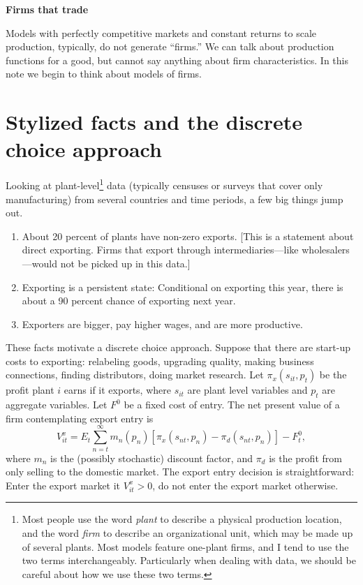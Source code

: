 \documentclass[11pt, pdftex]{article}
\newcommand{\ph}{\phantom}
\begin{document}
\ph{whatever}
\medskip

\centerline{\bf \Large Firms that trade}
\medskip

Models with perfectly competitive markets and constant returns to scale production, typically, do not generate ``firms.'' We can talk about production functions for a good, but cannot say anything about firm characteristics. In this note we begin to think about models of firms. 

\section{Stylized facts and the discrete choice approach}
Looking at plant-level\footnote{Most people use the word \textit{plant} to describe a physical production location, and the word \textit{firm} to describe an organizational unit, which may be made up of several plants.  Most models feature one-plant firms, and I tend to use the two terms interchangeably.  Particularly when dealing with data, we should be careful about how we use these two terms. } data (typically censuses or surveys that cover only manufacturing) from several countries and time periods, a few big things jump out.
\begin{enumerate}
  \item About 20 percent of plants have non-zero exports. [This is a statement about direct exporting. Firms that export through intermediaries---like wholesalers---would not be picked up in this data.]
  \item Exporting is a persistent state: Conditional on exporting this year, there is about a 90 percent chance of exporting next year.
  \item Exporters are bigger, pay higher wages, and are more productive.
\end{enumerate}
These facts motivate a discrete choice approach.  Suppose that there are start-up costs to exporting: relabeling goods, upgrading quality, making business connections, finding distributors, doing market research.  Let $\pi_x(s_{it},p_{t})$ be the profit plant $i$ earns if it exports, where $s_{it}$ are plant level variables and $p_{t}$ are aggregate variables.  Let $F^0$ be a fixed cost of entry.  The net present value of a firm contemplating export entry is
\begin{equation}
  V_{it}^x=E_t\sum_{n=t}^\infty m_{n}(p_n) \left[\pi_x(s_{nt},p_{n})-\pi_d(s_{nt},p_{n})\right] - F_{t}^0,
\end{equation}
where $m_n$ is the (possibly stochastic) discount factor, and $\pi_d$ is the profit from only selling to the domestic market. The export entry decision is straightforward: Enter the export market it $V_{it}^x>0$, do not enter the export market otherwise.
\end{document}
